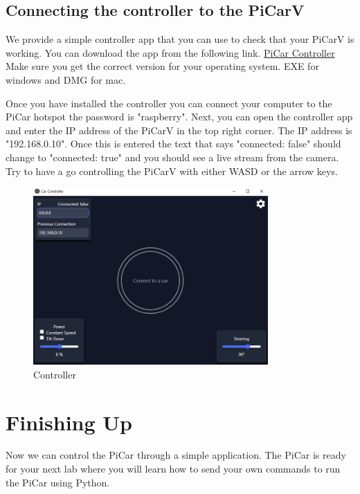 \documentclass[11pt]{report}
\begin{document}
\section{Connecting the controller to the PiCarV}
We provide a simple controller app that you can use to check that your PiCarV is working. You can download the app from the following link. 
\href{https://github.com/PiCarV/Controller/releases}{PiCar Controller} Make sure you get the correct version for your operating system. EXE for windows and DMG for mac.


Once you have installed the controller you can connect your computer to the PiCar hotspot the password is "raspberry". Next, you can open the controller app and enter the IP address of the PiCarV in the top right corner. The IP address is "192.168.0.10". Once this is entered the text that says "connected: false" should change to "connected: true" and you should see a live stream from the camera. Try to have a go controlling the PiCarV with either WASD or the arrow keys. 

\begin{figure}[h]
    \centering
    \includegraphics[width=0.8\textwidth]{controller.png}
    \caption{Controller}
    \label{fig:Controller}
\end{figure}

\chapter{Finishing Up}
Now we can control the PiCar through a simple application. The PiCar is ready for your next lab where you will learn how to send your own commands to run the PiCar using Python.
\end{document}
